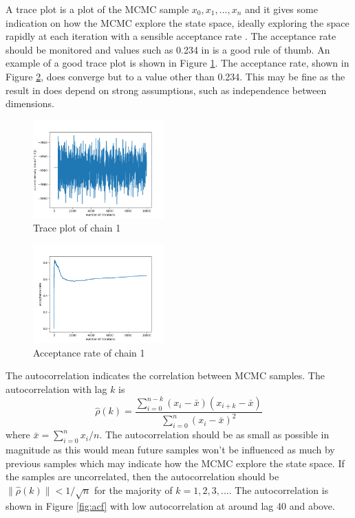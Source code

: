 \documentclass[10pt]{proc}
\newcommand{\dotdotdot}{...}
\begin{document}
A trace plot is a plot of the MCMC sample $x_0,x_1,\dotdotdot,x_n$ and it gives some indication on how the MCMC explore the state space, ideally exploring the space rapidly at each iteration with a sensible acceptance rate \citep{rosenthal2011optimal}. The acceptance rate should be monitored and values such as 0.234 in \cite{roberts1997weak} is a good rule of thumb. An example of a good trace plot is shown in Figure \ref{fig:trace}. The acceptance rate, shown in Figure \ref{fig:accept}, does converge but to a value other than 0.234. This may be fine as the result in \cite{roberts1997weak} does depend on strong assumptions, such as independence between dimensions.

\begin{figure}[ht]
  \centering
  \includegraphics[width=0.45\textwidth]{chain_1.png}
  \caption{Trace plot of chain 1}
  \label{fig:trace}
\end{figure}
\begin{figure}[ht]
  \centering
  \includegraphics[width=0.45\textwidth]{accept.png}
  \caption{Acceptance rate of chain 1}
  \label{fig:accept}
\end{figure}

The autocorrelation \citep{geyer2011mcmc} indicates the correlation between MCMC samples. The autocorrelation with lag $k$ is
\begin{equation}
\widehat{\rho}(k)=\dfrac
{
  \sum_{i=0}^{n-k}(x_i-\bar{x})(x_{i+k}-\bar{x})
}
{
  \sum_{i=0}^{n}(x_i-\bar{x})^2
}
\end{equation}
where $\bar{x}=\sum_{i=0}^nx_i/n$. The autocorrelation should be as small as possible in magnitude as this would mean future samples won't be influenced as much by previous samples which may indicate how the MCMC explore the state space. If the samples are uncorrelated, then the autocorrelation should be $\|\widehat{\rho}(k)\|<1/\sqrt{n}$ for the majority of $k=1,2,3,\dotdotdot$. The autocorrelation is shown in Figure \ref{fig:acf} with low autocorrelation at around lag 40 and above.
\end{document}
